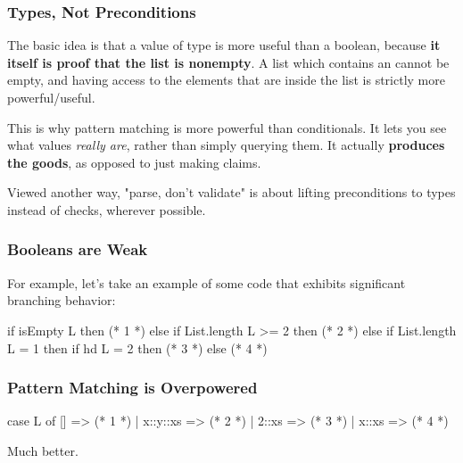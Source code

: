 \documentclass[aspectratio=169]{beamer}
\begin{document}
\begin{frame}[fragile]
  \frametitle{Types, Not Preconditions}

  \tgs

  The basic idea is that a value of type  is more useful than
  a boolean, because \textbf{it itself is proof that the list
  is nonempty}. A list which contains an  cannot be empty, and having
  access to the elements that are inside the list is strictly more powerful/useful.

  \pause
  \vspace{\fill}

  This is why pattern matching is more powerful than conditionals. It lets you see
  what values \textit{really are}, rather than simply querying them. It actually
  \textbf{produces the goods}, as opposed to just making claims.

  \pause
  \vspace{\fill}

  Viewed another way, "parse, don't validate" is about lifting preconditions to
  types instead of checks, wherever possible.
\end{frame}


\begin{frame}[fragile]
  \frametitle{Booleans are Weak}

  For example, let's take an example of some code that exhibits
  significant branching behavior:

  \pause
  \vspace{\fill}

  \begin{codeblock}
    if isEmpty L then
      (* 1 *)
    else if List.length L >= 2 then
      (* 2 *)
    else if List.length L = 1 then
      if hd L = 2 then
        (* 3 *)
      else
        (* 4 *)
  \end{codeblock}

\end{frame}
\begin{frame}[fragile]
  \frametitle{Pattern Matching is Overpowered}

  \begin{codeblock}
    case L of
      [] => (* 1 *)
    | x::y::xs => (* 2 *)
    | 2::xs => (* 3 *)
    | x::xs => (* 4 *)
  \end{codeblock}

  \pause
  \vspace{\fill}

  Much better.
\end{frame}
\end{document}
